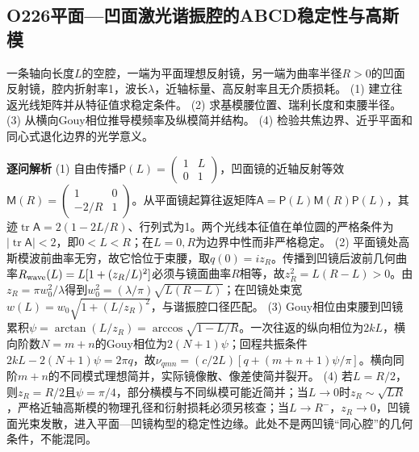 \subsection*{O226\quad 平面—凹面激光谐振腔的ABCD稳定性与高斯模}
一条轴向长度$L$的空腔，一端为平面理想反射镜，另一端为曲率半径$R>0$的凹面反射镜，腔内折射率1，波长$\lambda$，近轴标量、高反射率且无介质损耗。
(1) 建立往返光线矩阵并从特征值求稳定条件。
(2) 求基模腰位置、瑞利长度和束腰半径。
(3) 从横向Gouy相位推导模频率及纵模简并结构。
(4) 检验共焦边界、近乎平面和同心式退化边界的光学意义。
\par\textbf{逐问解析}
(1) 自由传播$\mathsf P(L)=\begin{pmatrix}1&L\\0&1\end{pmatrix}$，凹面镜的近轴反射等效$\mathsf M(R)=\begin{pmatrix}1&0\\-2/R&1\end{pmatrix}$。从平面镜起算往返矩阵$\mathsf A=\mathsf P(L)\mathsf M(R)\mathsf P(L)$，其迹$\operatorname{tr}\mathsf A=2(1-2L/R)$、行列式为1。两个光线本征值在单位圆的严格条件为$|\operatorname{tr}\mathsf A|<2$，即$0<L<R$；在$L=0,R$为边界中性而非严格稳定。
(2) 平面镜处高斯模波前曲率无穷，故它恰位于束腰，取$q(0)=iz_R$。传播到凹镜后波前几何曲率$R_{\rm wave}(L)=L[1+(z_R/L)^2]$必须与镜面曲率$R$相等，故$z_R^2=L(R-L)>0$。由$z_R=\pi w_0^2/\lambda$得到$w_0^2=(\lambda/\pi)\sqrt{L(R-L)}$；在凹镜处束宽$w(L)=w_0\sqrt{1+(L/z_R)^2}$，与谐振腔口径匹配。
(3) Gouy相位由束腰到凹镜累积$\psi=\arctan(L/z_R)=\arccos\sqrt{1-L/R}$。一次往返的纵向相位为$2kL$，横向阶数$N=m+n$的Gouy相位为$2(N+1)\psi$；回程共振条件$2kL-2(N+1)\psi=2\pi q$，故$\nu_{qmn}=(c/2L)[q+(m+n+1)\psi/\pi]$。横向同阶$m+n$的不同模式理想简并，实际镜像散、像差使简并裂开。
(4) 若$L=R/2$，则$z_R=R/2$且$\psi=\pi/4$，部分横模与不同纵模可能近简并；当$L\to0$时$z_R\sim\sqrt{LR}$，严格近轴高斯模的物理孔径和衍射损耗必须另核查；当$L\to R^-$，$z_R\to0$，凹镜面光束发散，进入平面—凹镜构型的稳定性边缘。此处不是两凹镜“同心腔”的几何条件，不能混同。
\par\medskip
